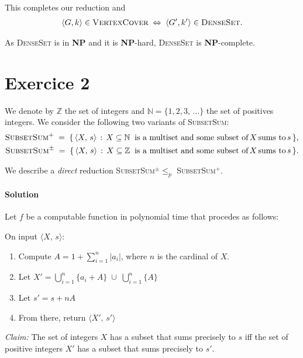 \documentclass{article}
\begin{document}
\medskip\noindent This completes our reduction and 
\begin{align*}
    \langle G, k\rangle\in\textsc{VertexCover}\; \Leftrightarrow\;\langle G', k'\rangle\in\textsc{DenseSet}.
\end{align*}

\noindent As \textsc{DenseSet} is in \textbf{NP} and it is \textbf{NP}-hard, \textsc{DenseSet} is \textbf{NP}-complete.

\newpage
\section*{Exercice 2}

We denote by $\mathbb{Z}$ the set of integers and $\mathbb{N}=\{1, 2, 3,\,\dots\}$ the set of positives integers. We consider the following two variants of \textsc{SubsetSum}:
\begin{align*}
    \textsc{SubsetSum}^+\; =\;\{\,\langle X,\, s\rangle\,:\,X\subseteq\mathbb{N}\;\;\text{is a multiset and some subset of}\, X\,\text{sums to}\,s\,\},\\
    \textsc{SubsetSum}^\pm\; =\;\{\,\langle X,\, s\rangle\,:\,X\subseteq\mathbb{Z}\;\;\text{is a multiset and some subset of}\, X\,\text{sums to}\,s\,\}.
\end{align*}

We describe a \textit{direct} reduction \textsc{SubsetSum}$^\pm\leq_p$ \textsc{SubsetSum}$^+$.
\bigskip
\paragraph{Solution}Let $f$ be a computable function in polynomial time that procedes as follows:

\noindent On input $\langle X,\, s\rangle$:
\begin{enumerate}[noitemsep, topsep=0pt]
    \item Compute $A=1+\sum_{i=1} ^{n} |a_i|$, where $n$ is the cardinal of $X$.
    \item Let $X'= \bigcup _{i=1} ^{n}\{a_i + A\}\;\cup\;\bigcup _{i=1} ^{n}\{A\}$
    \item Let $s'= s+nA$
    \item From there, return $\langle X',\, s'\rangle$
\end{enumerate}

\medskip\noindent\textit{Claim:} The set of integers $X$ has a subset that sums precisely to $s$ iff the set of positive integers $X'$ has a subset that sums precisely to $s'$.
\end{document}
